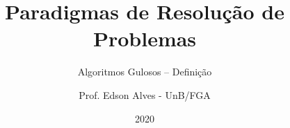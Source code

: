 \title{Paradigmas de Resolução de Problemas}
\subtitle{Algoritmos Gulosos -- Definição}
\author{Prof. Edson Alves - UnB/FGA}
\date{2020}
